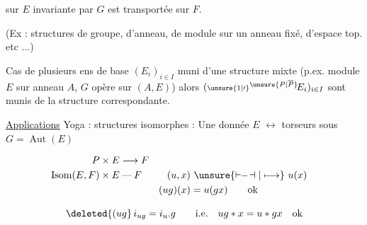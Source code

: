 sur $E$ invariante par $G$ est transportée sur $F$.

(Ex : structures de groupe, d'anneau, de module sur un anneau fixé, d'espace top. etc ...)

Cas de plusieurs ens de base $(E_i)_{i\in I}$  muni d'une structure mixte (p.ex. module $E$ sur anneau $A$, $G$ opère sur $(A,E)$) alors $({\scriptstyle\unsure{1|\prime}}{}^{\unsure{P|\overline P}}\!E_i)_{i\in I}$ sont munis de la structure correspondante.


\uline{Applications}\quad {} Yoga : structures isomorphes : Une  donnée $E$ $\longleftrightarrow$ torseurs sous $G=\operatorname{Aut}(E)$



\[
\begin{aligned}
P\times E&\longrightarrow F\\
\operatorname{Isom}(E,F)\times E&\mathbin{\text{---}} F
  & (u,x)&\ \unsure{\mathrel{\vdash\!\!-\!\dashv}|\longmapsto}\ u(x)\\
&& (ug)(x)&=u(gx)\qquad\text{ok}
\end{aligned}
\]


\[
\deleted{(ug}\,i_{ug}=i_u.g\qquad\text{i.e.}\quad ug*x=u*gx\quad\text{ok}
\]
